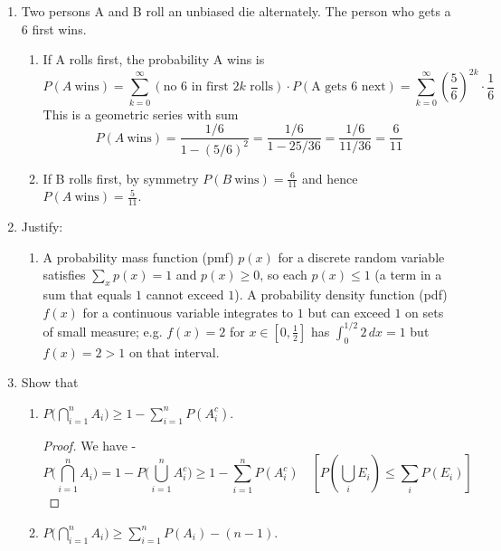 \begin{enumerate}
    \noindent Example: Let the sample space be $\{1,2,3,4\}$ with each outcome probability $\tfrac{1}{4}$. Define
    $$A=\{1,2\},\quad B=\{1,3\},\quad C=\{1,4\}.$$
    Then $P(A)=P(B)=P(C)=\tfrac{1}{2}$ and for each pair
    $$P(A\cap B)=P(A\cap C)=P(B\cap C)=P(\{1\})=\tfrac{1}{4}=P(A)P(B).$$
    Thus the three events are pairwise independent. But
    $$P(A\cap B\cap C)=P(\{1\})=\tfrac{1}{4}\neq \tfrac{1}{8}=P(A)P(B)P(C),$$
    so they are not mutually independent.
    \item Two persons A and B roll an unbiased die alternately. The person who gets a 6 first wins.
    \begin{enumerate}
        \item If A rolls first, the probability A wins is
        \[
        P(A\ \text{wins})=\sum_{k=0}^\infty ( \text{no 6 in first }2k\text{ rolls} )\cdot P(\text{A gets 6 next})
        =\sum_{k=0}^\infty \left(\frac{5}{6}\right)^{2k}\cdot\frac{1}{6}
        \]
        This is a geometric series with sum
        \[\boxed{
        P(A\ \text{wins})=\frac{1/6}{1-(5/6)^2}=\frac{1/6}{1-25/36}=\frac{1/6}{11/36}=\frac{6}{11}}
        \]
        \item If B rolls first, by symmetry $\boxed{P(B\ \text{wins})=\tfrac{6}{11}}$ and hence $\boxed{P(A\ \text{wins})=\tfrac{5}{11}}$.
    \end{enumerate}
    \item Justify:
    \begin{enumerate}
        \item A probability mass function (pmf) $p(x)$ for a discrete random variable satisfies $\sum_x p(x)=1$ and $p(x)\ge 0$, so each $p(x)\le 1$ (a term in a sum that equals $1$ cannot exceed $1$). A probability density function (pdf) $f(x)$ for a continuous variable integrates to $1$ but can exceed $1$ on sets of small measure; e.g. $f(x)=2$ for $x\in[0,\tfrac{1}{2}]$ has $\int_0^{1/2}2\,dx=1$ but $f(x)=2>1$ on that interval.
    \end{enumerate}
    \item Show that
    \begin{enumerate}
        \item $P\Big(\bigcap_{i=1}^n A_i\Big)\ge 1-\sum_{i=1}^n P(A_i^c)$.

        \noindent \begin{proof}
            We have - \\
            $$P\Big(\bigcap_{i=1}^n A_i\Big)=1-P\Big(\bigcup_{i=1}^n A_i^c\Big)\ge 1-\sum_{i=1}^n P(A_i^c) \quad  \left[P(\bigcup_i E_i)\le\sum_i P(E_i)\right]$$
        \end{proof}
        \item $P\Big(\bigcap_{i=1}^n A_i\Big)\ge \sum_{i=1}^n P(A_i)-(n-1)$.


\end{enumerate}
\end{enumerate}
